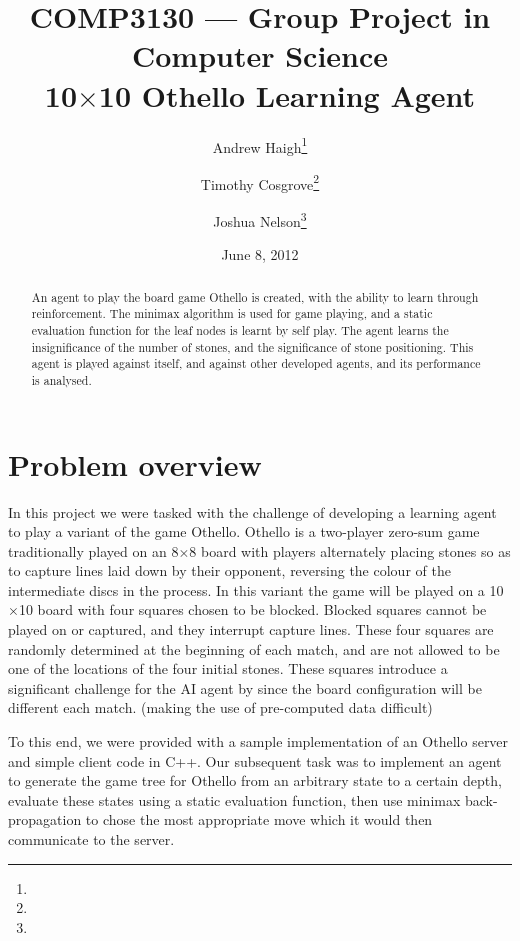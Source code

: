 \documentclass[11pt]{article}
\title{%
  COMP3130 --- Group Project in Computer Science \\
  10$\times$10 Othello Learning Agent}
\date{June 8, 2012}
\author{%
  Andrew Haigh\thanks{\uid{u4667010}} \and %
  Timothy Cosgrove\thanks{\uid{u4843619}} \and
  Joshua Nelson\thanks{\uid{u4850020}}}
\begin{document}
\maketitle
\begin{abstract}
  \label{abstract}
  An agent to play the board game Othello is created, with the ability
  to learn through reinforcement. The minimax algorithm is used for game
  playing, and a static evaluation function for the leaf nodes is learnt by
  self play.  The agent learns the insignificance of the number of stones, and
  the significance of stone positioning. This agent is played against itself,
  and against other developed agents, and its performance is analysed.
\end{abstract}
\clearpage

\section{Problem overview}
\label{sec:problem_overview}
In this project we were tasked with the challenge of developing a learning
agent to play a variant of the game Othello. Othello is a two-player zero-sum
game traditionally played on an 8$\times$8 board with players alternately
placing stones so as to capture lines laid down by their opponent, reversing
the colour of the intermediate discs in the process.
In this variant the game will be played on a 10$\times$10 board with four
squares chosen to be blocked. Blocked squares cannot be played on or captured,
and they interrupt capture lines. These four squares are randomly determined at
the beginning of each match, and are not allowed to be one of the
locations of the four initial stones. These squares introduce a significant challenge
for the AI agent by since the board configuration will be different each match.
(making the use of pre-computed data difficult)

To this end, we were provided with a sample implementation of an Othello
server and simple client code in C++. Our subsequent task was to implement an
agent to generate the game tree for Othello from an arbitrary state to a
certain depth, evaluate these states using a static evaluation function, then
use minimax back-propagation to chose the most appropriate move which it would
then communicate to the server.
\end{document}
